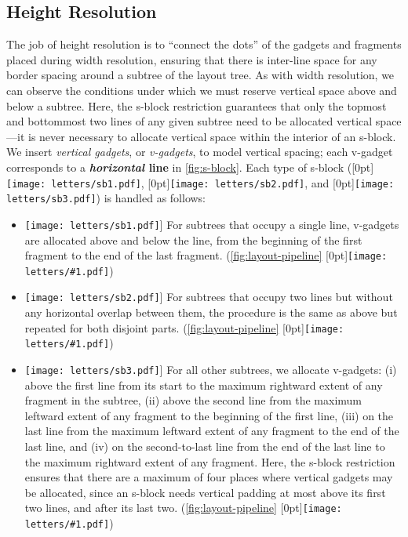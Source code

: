 \documentclass[acmsmall, screen]{acmart}
\newcommand{\caseBubble}[1]{\raisebox{-0.03in}[0pt]{\texttt{[image: letters/\#1.pdf]}}}
\newcommand{\sba}{\raisebox{0.005in}[0pt]{\texttt{[image: letters/sb1.pdf]}}}
\newcommand{\sbb}{\raisebox{-0.020in}[0pt]{\texttt{[image: letters/sb2.pdf]}}}
\newcommand{\sbc}{\raisebox{-0.030in}[0pt]{\texttt{[image: letters/sb3.pdf]}}}
\begin{document}
\subsection{Height Resolution}

The job of height resolution is to ``connect the dots'' of the gadgets and fragments placed during width resolution, ensuring that there is inter-line space for any border spacing around a subtree of the layout tree.
As with width resolution, we can observe the conditions under which we must reserve vertical space above and below a subtree.
Here, the s-block restriction guarantees that only the topmost and bottommost two lines of any given subtree need to be allocated vertical space---it is never necessary to allocate vertical space within the interior of an s-block.
We insert \textit{vertical gadgets}, or \textit{v-gadgets}, to model vertical spacing; each v-gadget corresponds to a \textbf{\textit{horizontal} line} in \autoref{fig:s-block}.
Each type of s-block (\sba, \sbb, and \sbc) is handled as follows:

\begin{itemize}

\item[\sba] For subtrees that occupy a single line, v-gadgets are allocated above and below the line, from the beginning of the first fragment to the end of the last fragment. (\autoref{fig:layout-pipeline} \caseBubble{h1})

\item[\sbb] For subtrees that occupy two lines but without any horizontal overlap between them, the procedure is the same as above but repeated for both disjoint parts. (\autoref{fig:layout-pipeline} \caseBubble{h2})



\item[\sbc] For all other subtrees, we allocate v-gadgets: (i) above the first line from its start to the maximum rightward extent of any fragment in the subtree, (ii) above the second line from the maximum leftward extent of any fragment to the beginning of the first line, (iii) on the last line from the maximum leftward extent of any fragment to the end of the last line, and (iv) on the second-to-last line from the end of the last line to the maximum rightward extent of any fragment. Here, the s-block restriction ensures that there are a maximum of four places where vertical gadgets may be allocated, since an s-block needs vertical padding at most above its first two lines, and after its last two. (\autoref{fig:layout-pipeline} \caseBubble{h3})

\end{itemize}
\end{document}
